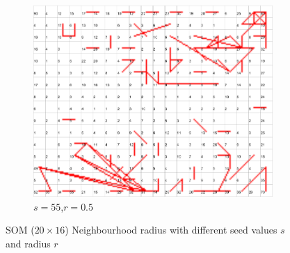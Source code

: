 \documentclass{acm_proc_article-sp}
\begin{document}
\begin{figure}
\begin{subfigure}[b]{0.30\linewidth}
        \label{fig:wine-newmid-radius-neighbourhood-graph--r-05-seed-7}
    \end{subfigure}
    \begin{subfigure}[b]{0.30\linewidth}
        \includegraphics[width=\linewidth]{img/wine-newmid-radius-neighbourhood-graph--r-05-seed-55}
        \caption{$s=55$,$r=0.5$}
        \label{fig:wine-newmid-radius-neighbourhood-graph--r-05-seed-55}
    \end{subfigure}
    \caption{SOM ($20\times16$) Neighbourhood radius with different seed values $s$ and radius $r$}
    \label{fig:wine-newmid-radius-neighbourhood-graph--r-05-seed}
\end{figure}
\end{document}

